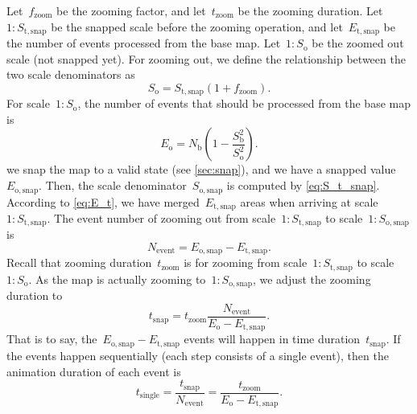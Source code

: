 \documentclass[twocolumn]{svjour3}          %
\begin{document}
Let~$f_\mathrm{zoom}$ be the zooming factor, and 
let~$t_\mathrm{zoom}$ be the zooming duration.
Let~$1:S_\mathrm{t,snap}$ be the snapped scale before the zooming operation, 
and let~$E_\mathrm{t,snap}$ 
be the number of events processed from the base map.
Let~$1:S_\mathrm{o}$ be the zoomed out scale (not snapped yet).
For zooming out, we define the relationship 
between the two scale denominators as
\begin{equation}
\label{eq:S_o}
S_\mathrm{o} = S_\mathrm{t,snap} (1 + f_\mathrm{zoom}).
\end{equation}
For scale~$1:S_\mathrm{o}$, the number of events
that should be processed from the base map is
\begin{equation*}
\label{eq:E_o}
E_\mathrm{o} = N_\mathrm{b} \left(1-\frac{S^2_\mathrm{b}}{S^2_\mathrm{o}}\right).
\end{equation*}
we snap the map to a valid state 
(see \sect\ref{sec:snap}),
and we have a snapped value~$E_\mathrm{o,snap}$.
Then, the scale denominator~$S_\mathrm{o,snap}$
is computed by \eq\ref{eq:S_t_snap}.
According to \eq\ref{eq:E_t}, we have merged~$E_\mathrm{t,snap}$ areas 
when arriving at scale~$1:S_\mathrm{t,snap}$.
The event number of zooming out
from scale~$1:S_\mathrm{t,snap}$ to scale~$1:S_\mathrm{o,snap}$ is
\begin{equation}
\label{eq:N_event}
N_\mathrm{event} = 
E_\mathrm{o,snap} - E_\mathrm{t,snap}.
\end{equation}
Recall that zooming duration~$t_\mathrm{zoom}$ is for zooming 
from scale~$1:S_\mathrm{t,snap}$ to scale~$1:S_\mathrm{o}$.
As the map is actually zooming to~$1:S_\mathrm{o,snap}$,
we adjust the zooming duration to
\begin{equation*}
\label{eq:E_i}
t_\mathrm{snap}= t_\mathrm{zoom} 
\frac{N_\mathrm{event}}
{E_\mathrm{o} - E_\mathrm{t,snap}}.
\end{equation*}
That is to say, the~$E_\mathrm{o,snap} - E_\mathrm{t,snap}$ events will happen 
in time duration~$t_\mathrm{snap}$.
If the events happen sequentially (each step consists of a single event), 
then the animation duration of each event is
\begin{equation}
\label{eq:t_single}
t_\mathrm{single}   = \frac{t_\mathrm{snap}}{N_\mathrm{event}} 
                    = \frac{t_\mathrm{zoom}}{E_\mathrm{o} - E_\mathrm{t,snap}}.
\end{equation}
\end{document}
